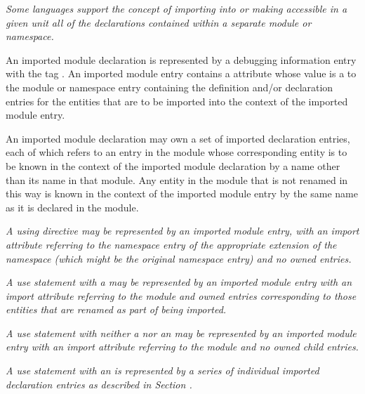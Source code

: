 \textit{Some languages support the concept of importing into or making
accessible in a given unit all of the declarations contained
within a separate module or namespace.
}

An imported module declaration is represented by a debugging
information entry with 
the 
tag \DWTAGimportedmoduleTARG.
An
imported module entry contains a 
\DWATimport{} attribute
whose value is a  
to the module or namespace entry
containing the definition and/or declaration entries for
the entities that are to be imported into the context of the
imported module entry.

An imported module declaration may own a set of imported
declaration entries, each of which refers to an entry in the
module whose corresponding entity is to be known in the context
of the imported module declaration by a name other than its
name in that module. Any entity in the module that is not
renamed in this way is known in the context of the imported
module entry by the same name as it is declared in the module.

\textit{A  using directive
may be represented by an imported module
\hypertarget{chap:DWATimportnamespaceusingdirective}{}
entry, with an import attribute referring to the namespace
entry of the appropriate extension of the namespace (which
might be the original namespace entry) and no owned entries.
}

\textit{A  use statement 
with a  may be
represented by an imported module entry with an import
attribute referring to the module and owned entries
corresponding to those entities that are renamed as part of
being imported.
}

\textit{A  use statement
with neither a  nor
an  may be represented by an imported module
entry with an import attribute referring to the module and
no owned child entries.
}

\textit{A use statement with an  is represented by a
series of individual imported declaration entries as described
in Section .
}

